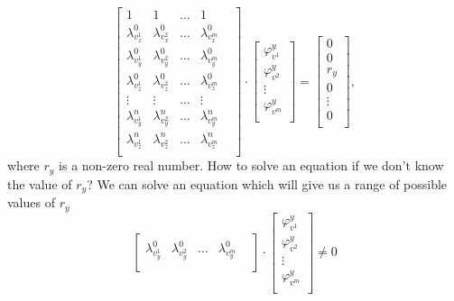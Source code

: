 \begin{equation}\label{eq:linear:affine}
  \begin{bmatrix}
    1                 & 1                 & \dots & 1                 & \\
    \lambda^0_{v^1_x} & \lambda^0_{v^2_x} & \dots & \lambda^0_{v^m_x} & \\
    \lambda^0_{v^1_y} & \lambda^0_{v^2_y} & \dots & \lambda^0_{v^m_y} & \\
    \lambda^0_{v^1_z} & \lambda^0_{v^2_z} & \dots & \lambda^0_{v^m_z} & \\
    \vdots            & \vdots            & \dots & \vdots            & \\
    \lambda^n_{v^1_y} & \lambda^n_{v^2_y} & \dots & \lambda^n_{v^m_y} & \\
    \lambda^n_{v^1_z} & \lambda^n_{v^2_z} & \dots & \lambda^n_{v^m_z} & \\
  \end{bmatrix}
  \cdot
  \begin{bmatrix}
    \varphi^y_{v^1} \\
    \varphi^y_{v^2} \\
    \vdots          \\
    \varphi^y_{v^m} \\
  \end{bmatrix}
  =
  \begin{bmatrix}
    0       \\
    0       \\
    r_y     \\
    0       \\
    \vdots  \\
    0       \\
  \end{bmatrix},
\end{equation}
where $r_y$ is a non-zero real number.
How to solve an equation if we don't know the value of $r_y$?
We can solve an equation which will give us a range of possible values of $r_y$
\begin{equation*}
  \begin{bmatrix}
    \lambda^0_{v^1_y} & \lambda^0_{v^2_y} & \dots & \lambda^0_{v^m_y} & \\
  \end{bmatrix}
  \cdot
  \begin{bmatrix}
    \varphi^y_{v^1} \\
    \varphi^y_{v^2} \\
    \vdots          \\
    \varphi^y_{v^m} \\
  \end{bmatrix}
  \neq 0
\end{equation*}
